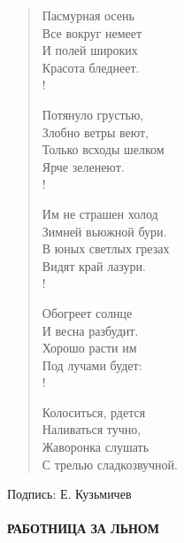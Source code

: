 \documentclass[]{memoir}
\begin{document}
\begin{verse}
Пасмурная осень\\
     Все вокруг немеет\\
И полей широких\\
     Красота бледнеет.\\!

Потянуло грустью,\\
     Злобно ветры веют,\\
Только всходы шелком\\
     Ярче зеленеют.\\!

Им не страшен холод\\
     Зимней вьюжной бури.\\
В юных светлых грезах\\
     Видят край лазури.\\!

Обогреет солнце\\
     И весна разбудит.\\
Хорошо расти им \\
     Под лучами будет:\\!

Колоситься, рдется\\
     Наливаться тучно,\\
Жаворонка слушать\\
С трелью сладкозвучной.
\end{verse}
     
Подпись: Е. Кузьмичев






\paragraph{РАБОТНИЦА ЗА ЛЬНОМ}
\end{document}
